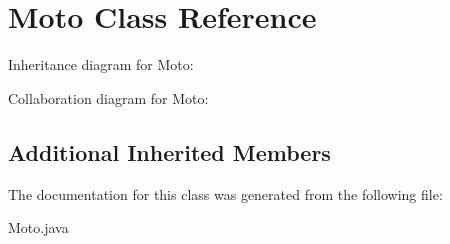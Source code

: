 \hypertarget{classMoto}{}\section{Moto Class Reference}
\label{classMoto}


Inheritance diagram for Moto\+:


Collaboration diagram for Moto\+:
\subsection*{Additional Inherited Members}


The documentation for this class was generated from the following file\+:\begin{DoxyCompactItemize}
\item 
Moto.\+java\end{DoxyCompactItemize}

